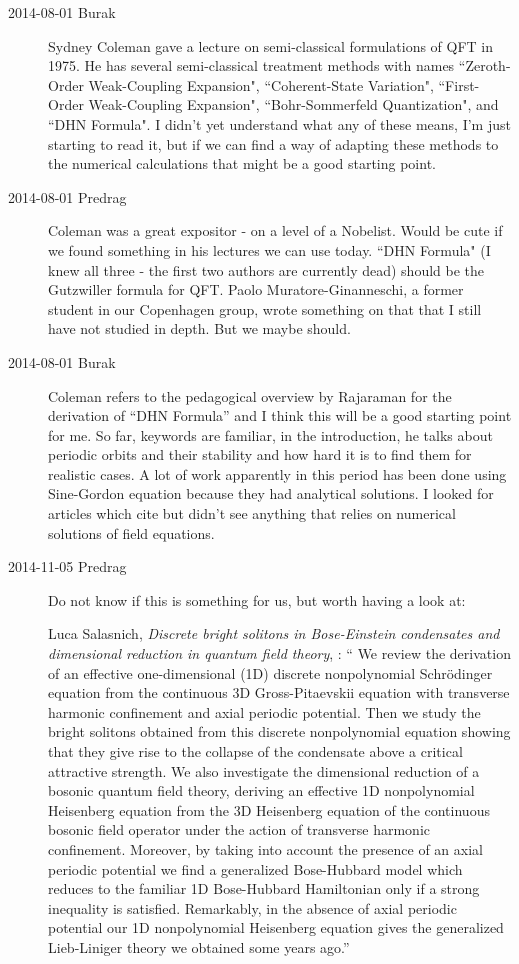 \begin{description}
\item[2014-08-01 Burak]
Sydney Coleman gave a lecture on semi-classical formulations of QFT in 1975.
He has several semi-classical treatment methods with names
``Zeroth-Order Weak-Coupling Expansion",
``Coherent-State Variation",
``First-Order Weak-Coupling Expansion",
``Bohr-Sommerfeld Quantization", and
``DHN Formula". I didn't yet understand what any of these means, I'm just starting
to read it, but if we can find a way of adapting these methods to the numerical
calculations that might be a good starting point.

\item[2014-08-01 Predrag]
Coleman was a great expositor - on a level of a Nobelist. Would be cute
if we found something in his lectures we can use today. ``DHN Formula" (I
knew all three - the first two authors are currently dead) should be the
Gutzwiller formula for QFT. Paolo Muratore-Ginanneschi, a former student
in our Copenhagen group, wrote something on that that I still
have not studied in depth. But we maybe should.

\item[2014-08-01 Burak]
Coleman refers to the pedagogical overview by Rajaraman for the derivation
of ``DHN Formula'' and I think this will be a good starting point for me. So far,
keywords are familiar, in the introduction, he talks about periodic orbits and
their stability and how hard it is to find them for realistic cases. A lot of work
apparently in this period has been done using Sine-Gordon equation because they
had analytical solutions. I looked for articles which cite  but didn't
see anything that relies on numerical solutions of field equations.

\item[2014-11-05 Predrag]
Do not know if this is something for us, but worth having a look at:

Luca Salasnich,
 \emph{Discrete bright solitons in Bose-Einstein condensates and dimensional
  reduction in quantum field theory}, :
`` We  review the derivation of an effective one-dimensional (1D) discrete
nonpolynomial Schr\"odinger equation from the continuous 3D Gross-Pitaevskii
equation with transverse harmonic confinement and axial periodic potential.
Then we study the bright solitons obtained from this discrete nonpolynomial
equation showing that they give rise to the collapse of the condensate above a
critical attractive strength. We also investigate the dimensional reduction of
a bosonic quantum field theory, deriving an effective 1D nonpolynomial
Heisenberg equation from the 3D Heisenberg equation of the continuous bosonic
field operator under the action of transverse harmonic confinement. Moreover,
by taking into account the presence of an axial periodic potential we find a
generalized Bose-Hubbard model which reduces to the familiar 1D Bose-Hubbard
Hamiltonian only if a strong inequality is satisfied. Remarkably, in the
absence of axial periodic potential our 1D nonpolynomial Heisenberg equation
gives the generalized Lieb-Liniger theory we obtained some years ago.''


\end{description}
